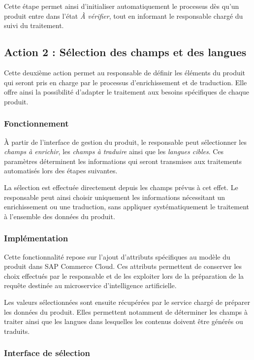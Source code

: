 Cette étape permet ainsi d'initialiser automatiquement le processus dès qu'un produit entre dans l'état \textit{À vérifier}, tout en informant le responsable chargé du suivi du traitement.

\subsection{Action 2 : Sélection des champs et des langues}

Cette deuxième action permet au responsable de définir les éléments du produit qui seront pris en charge par le processus d'enrichissement et de traduction. Elle offre ainsi la possibilité d'adapter le traitement aux besoins spécifiques de chaque produit.

\subsubsection{Fonctionnement}

À partir de l'interface de gestion du produit, le responsable peut sélectionner les \textit{champs à enrichir}, les \textit{champs à traduire} ainsi que les \textit{langues cibles}. Ces paramètres déterminent les informations qui seront transmises aux traitements automatisés lors des étapes suivantes.

La sélection est effectuée directement depuis les champs prévus à cet effet. Le responsable peut ainsi choisir uniquement les informations nécessitant un enrichissement ou une traduction, sans appliquer systématiquement le traitement à l'ensemble des données du produit.

\subsubsection{Implémentation}

Cette fonctionnalité repose sur l'ajout d'attributs spécifiques au modèle du produit dans SAP Commerce Cloud. Ces attributs permettent de conserver les choix effectués par le responsable et de les exploiter lors de la préparation de la requête destinée au microservice d'intelligence artificielle.

Les valeurs sélectionnées sont ensuite récupérées par le service chargé de préparer les données du produit. Elles permettent notamment de déterminer les champs à traiter ainsi que les langues dans lesquelles les contenus doivent être générés ou traduits.

\subsubsection{Interface de sélection}

